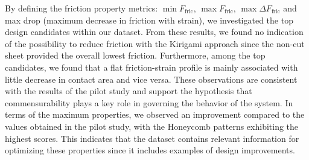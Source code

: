 By defining the friction property metrics: $\min F_{\text{fric}}$, $\max
F_{\text{fric}}$, $\max \Delta F_{\text{fric}}$ and max drop (maximum decrease
in friction with strain), we investigated the top design candidates within our
dataset. From these results, we found no indication of the possibility to
reduce friction with the Kirigami approach since the non-cut sheet provided the
overall lowest friction. Furthermore, among the top candidates, we found that a
flat friction-strain profile is mainly associated with little decrease in
contact area and vice versa. These observations are consistent with the results
of the pilot study and support the hypothesis that commensurability plays a key
role in governing the behavior of the system. In terms of the maximum
properties, we observed an improvement compared to the values obtained in the
pilot study, with the Honeycomb patterns exhibiting the highest scores. This
indicates that the dataset contains relevant information for optimizing these properties since it includes examples of design improvements.

